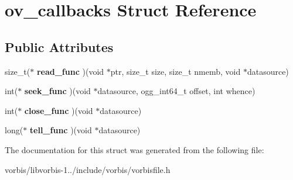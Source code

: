 \hypertarget{structov__callbacks}{\section{ov\+\_\+callbacks Struct Reference}
\label{structov__callbacks}
}
\subsection*{Public Attributes}
\begin{DoxyCompactItemize}
\item 
\hypertarget{structov__callbacks_a5b4759c6cb3b398197c07bec4b5b6102}{size\+\_\+t($\ast$ {\bfseries read\+\_\+func} )(void $\ast$ptr, size\+\_\+t size, size\+\_\+t nmemb, void $\ast$datasource)}\label{structov__callbacks_a5b4759c6cb3b398197c07bec4b5b6102}

\item 
\hypertarget{structov__callbacks_a0fc2e2644a6e41931324bf2995c2de71}{int($\ast$ {\bfseries seek\+\_\+func} )(void $\ast$datasource, ogg\+\_\+int64\+\_\+t offset, int whence)}\label{structov__callbacks_a0fc2e2644a6e41931324bf2995c2de71}

\item 
\hypertarget{structov__callbacks_a7bc6240db657fc50e0e9b43d28ffbb49}{int($\ast$ {\bfseries close\+\_\+func} )(void $\ast$datasource)}\label{structov__callbacks_a7bc6240db657fc50e0e9b43d28ffbb49}

\item 
\hypertarget{structov__callbacks_ac5626dc0267fdc675353c4bb83cfb06f}{long($\ast$ {\bfseries tell\+\_\+func} )(void $\ast$datasource)}\label{structov__callbacks_ac5626dc0267fdc675353c4bb83cfb06f}

\end{DoxyCompactItemize}


The documentation for this struct was generated from the following file\+:\begin{DoxyCompactItemize}
\item 
vorbis/libvorbis-\/1../include/vorbis/vorbisfile.\+h\end{DoxyCompactItemize}
